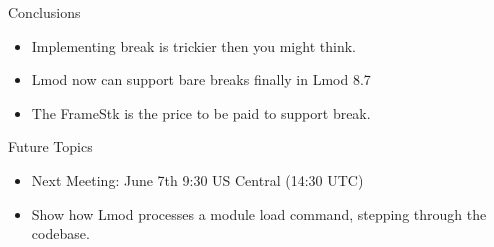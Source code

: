 \documentclass{beamer}
\begin{document}
\begin{frame}{Conclusions}
  \begin{itemize}
    \item Implementing break is trickier then you might think.
    \item Lmod now can support bare breaks finally in Lmod 8.7
    \item The FrameStk is the price to be paid to support break.
  \end{itemize}
\end{frame}

\begin{frame}{Future Topics}
  \begin{itemize}
    \item Next Meeting: June 7th 9:30 US Central (14:30 UTC)
    \item Show how Lmod processes a module load command, stepping through the codebase.
  \end{itemize}
\end{frame}
\end{document}
